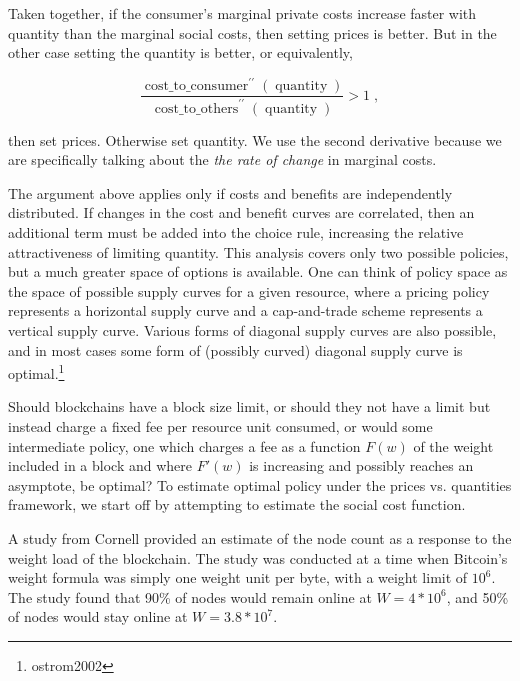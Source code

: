 \documentclass[12pt, final]{article}
\newcommand{\fname}[1]{ \operatorname{ #1 } }
\newcommand{\opname}[1]{ \operatorname{ #1 } }
\begin{document}
Taken together, if the consumer's marginal private costs increase faster with quantity than the marginal social costs, then setting prices is better. But in the other case setting the quantity is better, or equivalently,

\begin{equation}
\frac{ \fname{cost\_to\_consumer}^{\prime \prime}( \opname{quantity} ) }{ \fname{cost\_to\_others}^{\prime \prime}( \opname{quantity}) }  > 1 \; ,
\end{equation}

then set prices.  Otherwise set quantity.  We use the second derivative because we are specifically talking about the \emph{the rate of change} in marginal costs.

The argument above applies only if costs and benefits are independently distributed. If changes in the cost and benefit curves are correlated, then an additional term must be added into the choice rule, increasing the relative attractiveness of limiting quantity.  This analysis covers only two possible policies, but a much greater space of options is available.  One can think of policy space as the space of possible supply curves for a given resource, where a pricing policy represents a horizontal supply curve and a cap-and-trade scheme represents a vertical supply curve. Various forms of diagonal supply curves are also possible, and in most cases some form of (possibly curved) diagonal supply curve is optimal.\footnote{ostrom2002}

Should blockchains have a block size limit, or should they not have a limit but instead charge a fixed fee per resource unit consumed, or would some intermediate policy, one which charges a fee as a function $F(w)$ of the weight included in a block and where $F'(w)$ is increasing and possibly reaches an asymptote, be optimal? To estimate optimal policy under the prices vs. quantities framework, we start off by attempting to estimate the social cost function.

A study from Cornell provided an estimate of the node count as a response to the weight load of the blockchain. The study was conducted at a time when Bitcoin's weight formula was simply one weight unit per byte, with a weight limit of $10^6$. The study found that 90\% of nodes would remain online at $W = 4*10^6$, and 50\% of nodes would stay online at $W = 3.8 * 10^7$.
\end{document}
